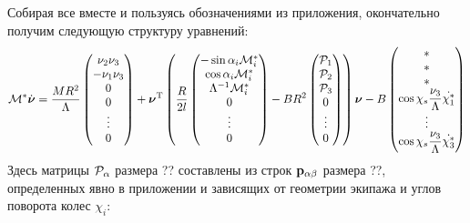 Собирая все вместе и пользуясь обозначениями из приложения, окончательно получим следующую структуру уравнений:
\begin{eqnarray}\label{eq:full_system}
\mathcal{M}^*\dot{\boldsymbol{\mathbf{\nu}}} = 
\frac{MR^2}{\Lambda}\left(\begin{matrix}
    \nu_2\nu_3\\
    -\nu_1\nu_3\\
    0\\
    0\\
    \vdots
    \\
    0
\end{matrix}\right)
+\boldsymbol{\mathbf{\nu}}^\mathrm{T}\left(
\frac{R}{2l}
\left(\begin{matrix}
    -\sin\alpha_i \mathcal{M}^*_i\\
    \cos\alpha_i \mathcal{M}^*_i\\
    \Lambda^{-1}\mathcal{M}^*_i\\
    0\\
    \vdots
    \\
    0
    \end{matrix}
\right)
-BR^2
\left(\begin{matrix}
    \mathcal{P}_1\\
    \mathcal{P}_2\\
    \mathcal{P}_3\\
    0\\
    \vdots
    \\
    0
\end{matrix}\right)
\right)
\boldsymbol{\mathbf{\nu}}
-B\left(\begin{matrix}
    *\\
    *\\
    *\\
    \cos\chi_s\displaystyle\frac{\displaystyle \nu_3}{\displaystyle \Lambda}\dot{\chi_1^*}\\
    \vdots
    \\
    \cos\chi_s\displaystyle\frac{\displaystyle \nu_3}{\displaystyle \Lambda}\dot{\chi_3^*}
\end{matrix}\right)
\end{eqnarray}
Здесь матрицы $\mathcal{P}_\alpha$ размера ?? составлены из строк $\mathbf{p}_{\alpha\beta}$ размера ??, определенных явно в приложении и зависящих от геометрии экипажа и углов поворота колес $\chi_i$:
